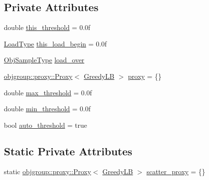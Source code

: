 \subsection*{Private Attributes}
\begin{DoxyCompactItemize}
\item 
double \hyperlink{structvt_1_1vrt_1_1collection_1_1lb_1_1_greedy_l_b_afd457b0829f152767e1aa5b07d7652ef}{this\+\_\+threshold} = 0.\+0f
\item 
\hyperlink{structvt_1_1vrt_1_1collection_1_1lb_1_1_base_l_b_a215e22b9f12678303f49615ae3be05cc}{Load\+Type} \hyperlink{structvt_1_1vrt_1_1collection_1_1lb_1_1_greedy_l_b_a95beecba794f8ac758242f1507a6d0ab}{this\+\_\+load\+\_\+begin} = 0.\+0f
\item 
\hyperlink{structvt_1_1vrt_1_1collection_1_1lb_1_1_base_l_b_a331d7da5bbf2883238427d86b54ddd7b}{Obj\+Sample\+Type} \hyperlink{structvt_1_1vrt_1_1collection_1_1lb_1_1_greedy_l_b_ae2701a450913d33bf8767164976b6e4c}{load\+\_\+over}
\item 
\hyperlink{structvt_1_1objgroup_1_1proxy_1_1_proxy}{objgroup\+::proxy\+::\+Proxy}$<$ \hyperlink{structvt_1_1vrt_1_1collection_1_1lb_1_1_greedy_l_b}{Greedy\+LB} $>$ \hyperlink{structvt_1_1vrt_1_1collection_1_1lb_1_1_greedy_l_b_ac121b6c8cafc463423b0ce7bdfb43806}{proxy} = \{\}
\item 
double \hyperlink{structvt_1_1vrt_1_1collection_1_1lb_1_1_greedy_l_b_a3134b75d2fd3ff63faa6a41b4c7b3dae}{max\+\_\+threshold} = 0.\+0f
\item 
double \hyperlink{structvt_1_1vrt_1_1collection_1_1lb_1_1_greedy_l_b_ae3d436ffc085fb846a1970018c593985}{min\+\_\+threshold} = 0.\+0f
\item 
bool \hyperlink{structvt_1_1vrt_1_1collection_1_1lb_1_1_greedy_l_b_a480ec7c5fa24215d70d34901f0549ff0}{auto\+\_\+threshold} = true
\end{DoxyCompactItemize}
\subsection*{Static Private Attributes}
\begin{DoxyCompactItemize}
\item 
static \hyperlink{structvt_1_1objgroup_1_1proxy_1_1_proxy}{objgroup\+::proxy\+::\+Proxy}$<$ \hyperlink{structvt_1_1vrt_1_1collection_1_1lb_1_1_greedy_l_b}{Greedy\+LB} $>$ \hyperlink{structvt_1_1vrt_1_1collection_1_1lb_1_1_greedy_l_b_a6be0a6b993320f141d5f94867511abfb}{scatter\+\_\+proxy} = \{\}
\end{DoxyCompactItemize}
